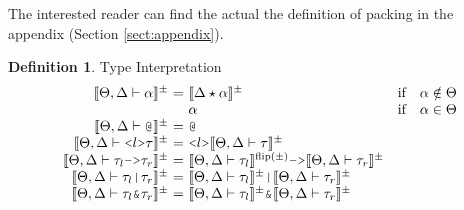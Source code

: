 \documentclass[acmsmall]{acmart}
\theoremstyle{definition}
\newtheorem{definition}{Definition}[section]
\begin{document}
The interested reader can find the actual the definition of packing in the appendix (Section \ref{sect:appendix}).

\begin{definition} 
  \label{def:type_interpretation}
  Type Interpretation 
  \hfill
  \small
  \\
  \[
  \begin{array}[t]{r@{}c@{}lcl}
      \llbracket \Theta, \Delta \entails \alpha \rrbracket^\pm 
      &\ =\ & 
      \llbracket \Delta \star  \alpha \rrbracket^\pm
      &\text{if}& 
      \alpha \notin \Theta

      \\

      &&
      \alpha
      &\text{if}&
      \alpha \in \Theta

      \\

      \llbracket \Theta, \Delta \entails \J{@} \rrbracket^\pm 
      &\ =\ & 
      \J{@}
      &&

      \\

      \llbracket \Theta, \Delta \entails \J{<}l\J{>}\tau \rrbracket^\pm
      &\ =\ & 
      \J{<}l\J{>}\llbracket \Theta, \Delta \entails \tau \rrbracket^\pm

      \\

      \llbracket \Theta, \Delta \entails \tau_l\J{->}\tau_r \rrbracket^\pm 
      &\ =\ & 
      \llbracket \Theta, \Delta \entails \tau_l \rrbracket^{\text{flip}(\pm)}
      \J{->}
      \llbracket \Theta, \Delta \entails \tau_r \rrbracket^\pm

      \\

      \llbracket \Theta, \Delta \entails \tau_l\J{|}\tau_r \rrbracket^\pm
      &\ =\ & 
      \llbracket \Theta, \Delta \entails \tau_l \rrbracket^\pm
      \J{|}
      \llbracket \Theta, \Delta \entails \tau_r \rrbracket^{\pm}

      \\

      \llbracket \Theta, \Delta \entails \tau_l\J{\&}\tau_r \rrbracket^\pm 
      &\ =\ & 
      \llbracket \Theta, \Delta \entails \tau_l \rrbracket^\pm
      \J{\&}
      \llbracket \Theta, \Delta \entails \tau_r \rrbracket^{\pm}

      \\


\end{array}\]
\end{definition}
\end{document}
